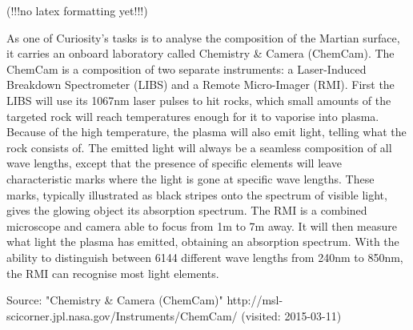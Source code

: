 (!!!no latex formatting yet!!!)

As one of Curiosity's tasks is to analyse the composition of the Martian surface, it carries an onboard laboratory called Chemistry & Camera (ChemCam).
 The ChemCam is a composition of two separate instruments: a Laser-Induced Breakdown Spectrometer (LIBS) and a Remote Micro-Imager (RMI).
 First the LIBS will use its 1067nm laser pulses to hit rocks, which small amounts of the targeted rock will reach temperatures enough for it to vaporise into plasma.
 Because of the high temperature, the plasma will also emit light, telling what the rock consists of.
 The emitted light will always be a seamless composition of all wave lengths, except that the presence of specific elements will leave characteristic marks where the light is gone at specific wave lengths.
 These marks, typically illustrated as black stripes onto the spectrum of visible light, gives the glowing object its absorption spectrum.
 The RMI is a combined microscope and camera able to focus from 1m to 7m away.
 It will then measure what light the plasma has emitted, obtaining an absorption spectrum.
 With the ability to distinguish between 6144 different wave lengths from 240nm to 850nm, the RMI can recognise most light elements.

Source:
"Chemistry & Camera (ChemCam)"
http://msl-scicorner.jpl.nasa.gov/Instruments/ChemCam/ (visited: 2015-03-11)